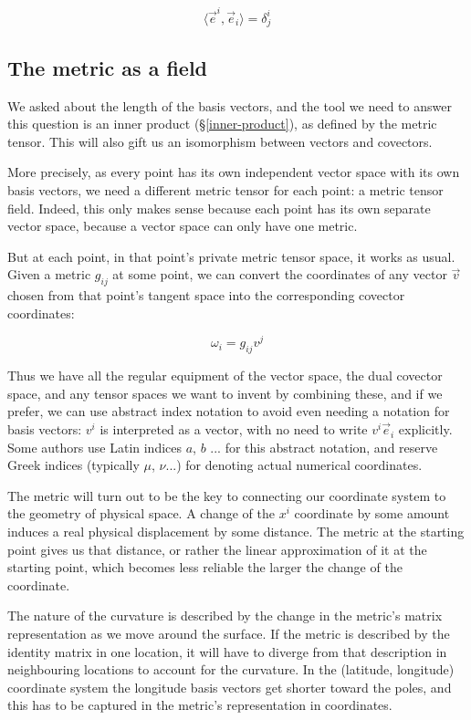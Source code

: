 $$
\langle \vec{e}^i , \vec{e}_i \rangle = \delta^i_j
$$

\subsection{The metric as a field}

We asked about the length of the basis vectors, and the tool we need to answer this question is an inner product (§\ref{inner-product}), as defined by the metric tensor. This will also gift us an isomorphism between vectors and covectors.

More precisely, as every point has its own independent vector space with its own basis vectors, we need a different metric tensor for each point: a metric tensor field. Indeed, this only makes sense because each point has its own separate vector space, because a vector space can only have one metric.

But at each point, in that point's private metric tensor space, it works as usual. Given a metric $g_{ij}$ at some point, we can convert the coordinates of any vector $\vec{v}$ chosen from that point's tangent space into the corresponding covector coordinates:

$$
\omega_i = g_{ij} v^j
$$

Thus we have all the regular equipment of the vector space, the dual covector space, and any tensor spaces we want to invent by combining these, and if we prefer, we can use abstract index notation to avoid even needing a notation for basis vectors: $v^i$ is interpreted as a vector, with no need to write $v^i \vec{e}_i$ explicitly. Some authors use Latin indices $a$, $b$ ... for this abstract notation, and reserve Greek indices (typically $\mu$, $\nu$...) for denoting actual numerical coordinates.

The metric will turn out to be the key to connecting our coordinate system to the geometry of physical space. A change of the $x^i$ coordinate by some amount induces a real physical displacement by some distance. The metric at the starting point gives us that distance, or rather the linear approximation of it at the starting point, which becomes less reliable the larger the change of the coordinate.

The nature of the curvature is described by the change in the metric's matrix representation as we move around the surface. If the metric is described by the identity matrix in one location, it will have to diverge from that description in neighbouring locations to account for the curvature. In the (latitude, longitude) coordinate system the longitude basis vectors get shorter toward the poles, and this has to be captured in the metric's representation in coordinates.

